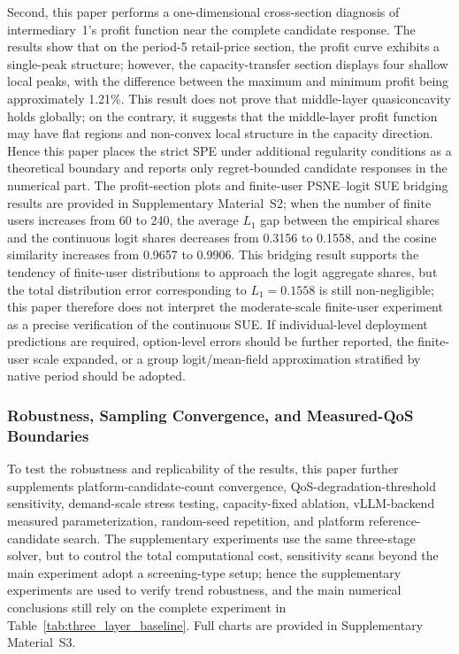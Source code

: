 \documentclass[11pt,a4paper]{article}
\begin{document}
Second, this paper performs a one-dimensional cross-section diagnosis of intermediary~1's profit function near the complete candidate response. The results show that on the period-5 retail-price section, the profit curve exhibits a single-peak structure; however, the capacity-transfer section displays four shallow local peaks, with the difference between the maximum and minimum profit being approximately 1.21\%. This result does not prove that middle-layer quasiconcavity holds globally; on the contrary, it suggests that the middle-layer profit function may have flat regions and non-convex local structure in the capacity direction. Hence this paper places the strict SPE under additional regularity conditions as a theoretical boundary and reports only regret-bounded candidate responses in the numerical part. The profit-section plots and finite-user PSNE--logit SUE bridging results are provided in Supplementary Material~S2; when the number of finite users increases from 60 to 240, the average $L_1$ gap between the empirical shares and the continuous logit shares decreases from 0.3156 to 0.1558, and the cosine similarity increases from 0.9657 to 0.9906. This bridging result supports the tendency of finite-user distributions to approach the logit aggregate shares, but the total distribution error corresponding to $L_1=0.1558$ is still non-negligible; this paper therefore does not interpret the moderate-scale finite-user experiment as a precise verification of the continuous SUE. If individual-level deployment predictions are required, option-level errors should be further reported, the finite-user scale expanded, or a group logit/mean-field approximation stratified by native period should be adopted.

\subsubsection{Robustness, Sampling Convergence, and Measured-QoS Boundaries}
\label{sec:robustness_ablation}

To test the robustness and replicability of the results, this paper further supplements platform-candidate-count convergence, QoS-degradation-threshold sensitivity, demand-scale stress testing, capacity-fixed ablation, vLLM-backend measured parameterization, random-seed repetition, and platform reference-candidate search. The supplementary experiments use the same three-stage solver, but to control the total computational cost, sensitivity scans beyond the main experiment adopt a screening-type setup; hence the supplementary experiments are used to verify trend robustness, and the main numerical conclusions still rely on the complete experiment in Table~\ref{tab:three_layer_baseline}. Full charts are provided in Supplementary Material~S3.
\end{document}
